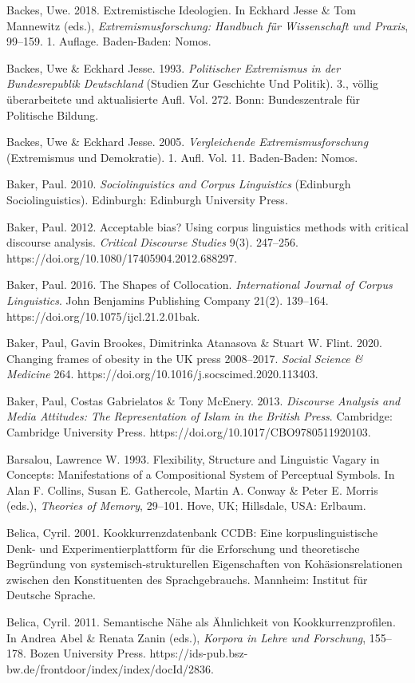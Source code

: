Backes, Uwe. 2018. Extremistische Ideologien. In Eckhard Jesse \& Tom Mannewitz (eds.), \emph{Extremismusforschung: Handbuch für Wissenschaft und Praxis}, 99--159. 1. Auflage. Baden-Baden: Nomos.

Backes, Uwe \& Eckhard Jesse. 1993. \emph{Politischer Extremismus in der Bundesrepublik Deutschland} (Studien Zur Geschichte Und Politik). 3., völlig überarbeitete und aktualisierte Aufl. Vol. 272. Bonn: Bundeszentrale für Politische Bildung.

Backes, Uwe \& Eckhard Jesse. 2005. \emph{Vergleichende Extremismusforschung} (Extremismus und Demokratie). 1. Aufl. Vol. 11. Baden-Baden: Nomos.

Baker, Paul. 2010. \emph{Sociolinguistics and Corpus Linguistics} (Edinburgh Sociolinguistics). Edinburgh: Edinburgh University Press.

Baker, Paul. 2012. Acceptable bias? Using corpus linguistics methods with critical discourse analysis. \emph{Critical Discourse Studies} 9(3). 247--256. https://doi.org/10.1080/17405904.2012.688297.

Baker, Paul. 2016. The Shapes of Collocation. \emph{International Journal of Corpus Linguistics}. John Benjamins Publishing Company 21(2). 139--164. https://doi.org/10.1075/ijcl.21.2.01bak.

Baker, Paul, Gavin Brookes, Dimitrinka Atanasova \& Stuart W. Flint. 2020. Changing frames of obesity in the UK press 2008--2017. \emph{Social Science \& Medicine} 264. https://doi.org/10.1016/j.socscimed.2020.113403.

Baker, Paul, Costas Gabrielatos \& Tony McEnery. 2013. \emph{Discourse Analysis and Media Attitudes: The Representation of Islam in the British Press}. Cambridge: Cambridge University Press. https://doi.org/10.1017/CBO9780511920103.

Barsalou, Lawrence W. 1993. Flexibility, Structure and Linguistic Vagary in Concepts: Manifestations of a Compositional System of Perceptual Symbols. In Alan F. Collins, Susan E. Gathercole, Martin A. Conway \& Peter E. Morris (eds.), \emph{Theories of Memory}, 29--101. Hove, UK; Hillsdale, USA: Erlbaum.

Belica, Cyril. 2001. Kookkurrenzdatenbank CCDB: Eine korpuslinguistische Denk- und Experimentierplattform für die Erforschung und theoretische Begründung von systemisch-strukturellen Eigenschaften von Kohäsionsrelationen zwischen den Konstituenten des Sprachgebrauchs. Mannheim: Institut für Deutsche Sprache.

Belica, Cyril. 2011. Semantische Nähe als Ähnlichkeit von Kookkurrenzprofilen. In Andrea Abel \& Renata Zanin (eds.), \emph{Korpora in Lehre und Forschung}, 155--178. Bozen University Press. https://ids-pub.bsz-bw.de/frontdoor/index/index/docId/2836.

